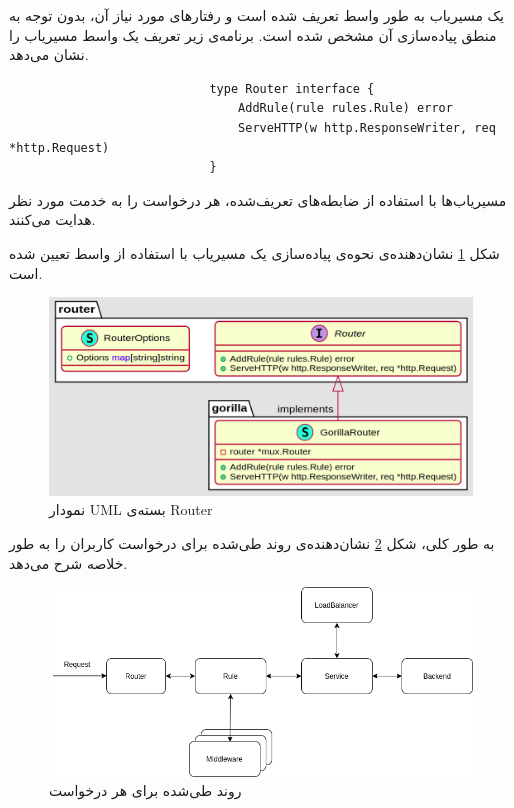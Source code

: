 یک مسیریاب به طور واسط تعریف شده‌ است و رفتار‌های مورد نیاز آن، بدون توجه به منطق پیاده‌سازی آن مشخص شده است. برنامه‌ی زیر تعریف یک واسط مسیریاب را نشان می‌دهد.

\cleardoublepage

\begin{latin}
    \begin{lstlisting}
                            type Router interface {
                                AddRule(rule rules.Rule) error
                                ServeHTTP(w http.ResponseWriter, req *http.Request)
                            }
    \end{lstlisting}
\end{latin}

مسیریاب‌ها با استفاده از ضابطه‌های تعریف‌شده، هر درخواست را به خدمت مورد نظر هدایت می‌کنند.

شکل
\ref{router_package}
نشان‌دهنده‌ی نحوه‌ی پیاده‌سازی یک مسیریاب با استفاده ‌از واسط تعیین شده است.

\begin{figure}[H]
    \centering
    \caption{نمودار UML بسته‌ی Router}
    \label{router_package}
    \includegraphics[scale=0.2]{images/Router.png}
\end{figure}

به طور کلی، شکل
\ref{flow}
نشان‌دهنده‌ی روند طی‌شده برای درخواست کاربران را به طور خلاصه شرح می‌دهد.

\begin{figure}[H]
    \centering
    \caption{روند طی‌شده برای هر درخواست}
    \label{flow}
    \includegraphics[scale=0.4]{images/Flow.png}
\end{figure}

